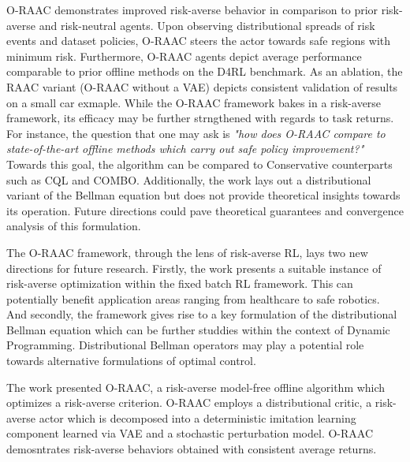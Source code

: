 \documentclass[11pt,letterpaper]{article}
\begin{document}
O-RAAC demonstrates improved risk-averse behavior in comparison to prior risk-averse and risk-neutral agents. Upon observing distributional spreads of risk events and dataset policies, O-RAAC steers the actor towards safe regions with minimum risk. Furthermore, O-RAAC agents depict average performance comparable to prior offline methods on the D4RL benchmark. As an ablation, the RAAC variant (O-RAAC without a VAE) depicts consistent validation of results on a small car exmaple. While the O-RAAC framework bakes in a risk-averse framework, its efficacy may be further strngthened with regards to task returns. For instance, the question that one may ask is \textit{"how does O-RAAC compare to state-of-the-art offline methods which carry out safe policy improvement?"} Towards this goal, the algorithm can be compared to Conservative counterparts such as CQL and COMBO. Additionally, the work lays out a distributional variant of the Bellman equation but does not provide theoretical insights towards its operation. Future directions could pave theoretical guarantees and convergence analysis of this formulation.

The O-RAAC framework, through the lens of risk-averse RL, lays two new directions for future research. Firstly, the work presents a suitable instance of risk-averse optimization within the fixed batch RL framework. This can potentially benefit application areas ranging from healthcare to safe robotics. And secondly, the framework gives rise to a key formulation of the distributional Bellman equation which can be further studdies within the context of Dynamic Programming. Distributional Bellman operators may play a potential role towards alternative formulations of optimal control.

The work presented O-RAAC, a risk-averse model-free offline algorithm which optimizes a risk-averse criterion. O-RAAC employs a distributional critic, a risk-averse actor which is decomposed into a deterministic imitation learning component learned via VAE and a stochastic perturbation model. O-RAAC demosntrates risk-averse behaviors obtained with consistent average returns.
\end{document}
